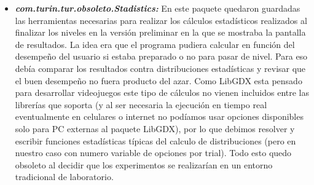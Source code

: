 \documentclass{article}
\numberwithin{figure}{section}
\begin{document}
\begin{itemize}
        \item \textit{\textbf{com.turin.tur.obsoleto.Stadistics:}} En este paquete quedaron guardadas las herramientas necesarias para realizar los cálculos estadísticos realizados al finalizar los niveles en la versión preliminar en la que se mostraba la pantalla de resultados. La idea era que el programa pudiera calcular en función del desempeño del usuario si estaba preparado o no para pasar de nivel. Para eso debía comparar los resultados contra distribuciones estadísticas y revisar que el buen desempeño no fuera producto del azar. Como LibGDX esta pensado para desarrollar videojuegos este tipo de cálculos no vienen incluidos entre las librerías que soporta (y al ser necesaria la ejecución en tiempo real eventualmente en celulares o internet no podíamos usar opciones disponibles solo para PC externas al paquete LibGDX), por lo que debimos resolver y escribir funciones estadísticas típicas del calculo de distribuciones (pero en nuestro caso con numero variable de opciones por trial). Todo esto quedo obsoleto al decidir que los experimentos se realizarían en un entorno tradicional de laboratorio. 
        

\end{itemize}
\end{document}
